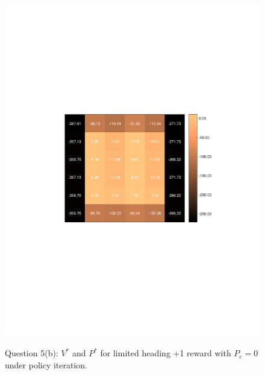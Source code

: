 \documentclass{article}
\begin{document}
\begin{figure}[h!]
\begin{minipage}{0.4\textwidth}
{			\includegraphics[trim={5cm 9cm 3cm 9cm},clip,scale = 0.7]{plots/Probabilistic/5bPe0PI_V.pdf}
			\label{fig:subfig2}} 
	\end{minipage}
	
	\caption{Question 5(b): $V^*$ and $P^*$ for limited heading +1 reward with $P_{e} = 0$ under policy iteration.}
	\label{fig:globfig}
\end{figure}
\end{document}
